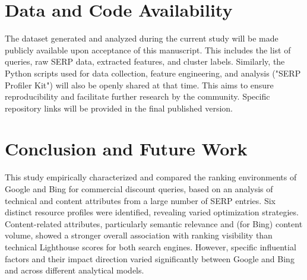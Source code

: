 \documentclass[a4paper,fleqn]{cas-sc}
\begin{document}
\section{Data and Code Availability}
\label{sec:data_code_availability}
The dataset generated and analyzed during the current study will be made publicly available upon acceptance of this manuscript. This includes the list of queries, raw SERP data, extracted features, and cluster labels. Similarly, the Python scripts used for data collection, feature engineering, and analysis ("SERP Profiler Kit") will also be openly shared at that time. This aims to ensure reproducibility and facilitate further research by the community. Specific repository links will be provided in the final published version.

\section{Conclusion and Future Work}
\label{sec:conclusion}
This study empirically characterized and compared the ranking environments of Google and Bing for commercial discount queries, based on an analysis of technical and content attributes from a large number of SERP entries. Six distinct resource profiles were identified, revealing varied optimization strategies. Content-related attributes, particularly semantic relevance and (for Bing) content volume, showed a stronger overall association with ranking visibility than technical Lighthouse scores for both search engines. However, specific influential factors and their impact direction varied significantly between Google and Bing and across different analytical models.
\end{document}
